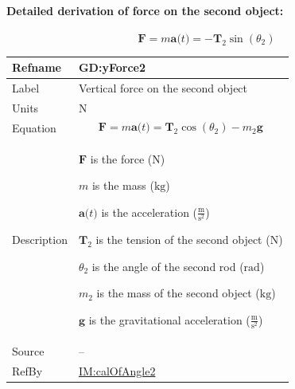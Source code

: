 \documentclass[12pt]{article}
\begin{document}
\paragraph{Detailed derivation of force on the second object:}
\label{GD:xForce2Deriv}
\begin{displaymath}
\symbf{F}=m \symbf{a}\text{(}t\text{)}=-{\symbf{T}_{2}} \sin\left({θ_{2}}\right)
\end{displaymath}
\vspace{\baselineskip}
\noindent
\begin{minipage}{\textwidth}
\begin{tabular}{>{\raggedright}p{}>{\raggedright\arraybackslash}p{}}
\toprule \textbf{Refname} & \textbf{GD:yForce2}
\label{GD:yForce2}
\\ \midrule
Label & Vertical force on the second object
        
\\ \midrule
Units & ${\text{N}}$
        
\\ \midrule
Equation & \begin{displaymath}
           \symbf{F}=m \symbf{a}\text{(}t\text{)}={\symbf{T}_{2}} \cos\left({θ_{2}}\right)-{m_{2}} \symbf{g}
           \end{displaymath}
\\ \midrule
Description & \begin{symbDescription}
              \item{$\symbf{F}$ is the force (${\text{N}}$)}
              \item{$m$ is the mass (${\text{kg}}$)}
              \item{$\symbf{a}\text{(}t\text{)}$ is the acceleration ($\frac{\text{m}}{\text{s}^{2}}$)}
              \item{${\symbf{T}_{2}}$ is the tension of the second object (${\text{N}}$)}
              \item{${θ_{2}}$ is the angle of the second rod (${\text{rad}}$)}
              \item{${m_{2}}$ is the mass of the second object (${\text{kg}}$)}
              \item{$\symbf{g}$ is the gravitational acceleration ($\frac{\text{m}}{\text{s}^{2}}$)}
              \end{symbDescription}
\\ \midrule
Source & --
         
\\ \midrule
RefBy & \hyperref[IM:calOfAngle2]{IM:calOfAngle2}
        
\\ \bottomrule
\end{tabular}
\end{minipage}
\end{document}
